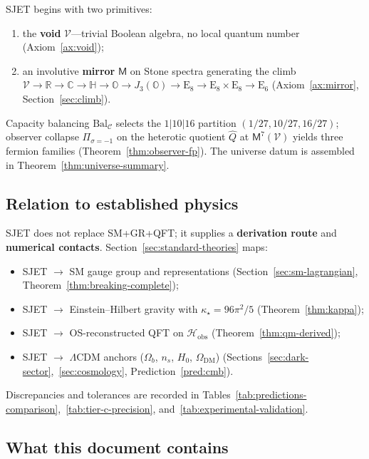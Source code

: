 \documentclass[11pt]{article}
\theoremstyle{plain}
\theoremstyle{definition}
\theoremstyle{remark}
\numberwithin{equation}{section}
\newcommand{\R}{\mathbb{R}}
\newcommand{\C}{\mathbb{C}}
\newcommand{\Quat}{\mathbb{H}}
\newcommand{\Oct}{\mathbb{O}}
\newcommand{\jalg}{J_3(\mathbb{O})}
\newcommand{\E}[1]{\mathrm{E}_{#1}}
\newcommand{\Void}{\mathcal{V}}
\newcommand{\Mirror}{\mathsf{M}}
\begin{document}
SJET begins with two primitives:
\begin{enumerate}[label=(\roman*),leftmargin=*]
  \item the \textbf{void} $\Void$---trivial Boolean algebra, no local quantum
    number (Axiom~\ref{ax:void});
  \item an involutive \textbf{mirror} $\Mirror$ on Stone spectra generating the
    climb $\Void\to\R\to\C\to\Quat\to\Oct\to\jalg\to\E{8}\to\E{8}\times\E{8}\to\E{6}$
    (Axiom~\ref{ax:mirror}, Section~\ref{sec:climb}).
\end{enumerate}
Capacity balancing $\mathrm{Bal}_{\mathcal{C}}$ selects the $1|10|16$ partition
$(1/27,10/27,16/27)$; observer collapse $\Pi_{\sigma=-1}$ on the heterotic
quotient $\hat Q$ at $\Mirror^7(\Void)$ yields three fermion families
(Theorem~\ref{thm:observer-fp}). The universe datum is assembled in
Theorem~\ref{thm:universe-summary}.

\subsection{Relation to established physics}

SJET does not replace SM+GR+QFT; it supplies a \textbf{derivation route} and
\textbf{numerical contacts}. Section~\ref{sec:standard-theories} maps:
\begin{itemize}[leftmargin=*]
  \item SJET $\to$ SM gauge group and representations
    (Section~\ref{sec:sm-lagrangian}, Theorem~\ref{thm:breaking-complete});
  \item SJET $\to$ Einstein--Hilbert gravity with $\kappa_\star=96\pi^2/5$
    (Theorem~\ref{thm:kappa});
  \item SJET $\to$ OS-reconstructed QFT on $\mathcal{H}_{\mathrm{obs}}$
    (Theorem~\ref{thm:qm-derived});
  \item SJET $\to$ $\Lambda$CDM anchors ($\Omega_b$, $n_s$, $H_0$, $\Omega_{\mathrm{DM}}$)
    (Sections~\ref{sec:dark-sector},~\ref{sec:cosmology},
    Prediction~\ref{pred:cmb}).
\end{itemize}
Discrepancies and tolerances are recorded in
Tables~\ref{tab:predictions-comparison},~\ref{tab:tier-c-precision},
and~\ref{tab:experimental-validation}.

\subsection{What this document contains}
\end{document}
